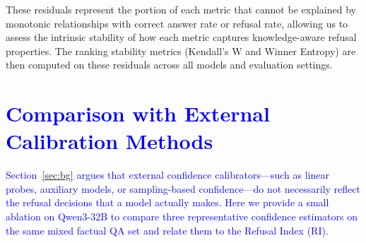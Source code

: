 \documentclass{article} %
\theoremstyle{definition}
\newcommand{\wigglyblue}[1]{\textcolor{blue}{#1}}
\begin{document}
These residuals represent the portion of each metric that cannot be explained by monotonic relationships with correct answer rate or refusal rate, allowing us to assess the intrinsic stability of how each metric captures knowledge-aware refusal properties. The ranking stability metrics (Kendall's W and Winner Entropy) are then computed on these residuals across all models and evaluation settings.


\section{\wigglyblue{Comparison with External Calibration Methods}}
\label{app:external-calibration}

\wigglyblue{Section~\ref{sec:bg} argues that external confidence calibrators---such as linear probes, auxiliary models, or sampling-based confidence---do not necessarily reflect the refusal decisions that a model actually makes. Here we provide a small ablation on Qwen3-32B to compare three representative confidence estimators on the same mixed factual QA set and relate them to the Refusal Index (RI).}
\end{document}
